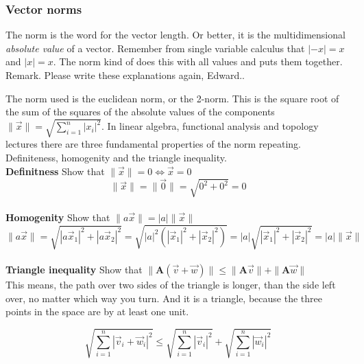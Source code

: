 \documentclass[a4paper]{article}
\begin{document}
\subsubsection{Vector norms}

The norm is the word for the vector length. Or better, it is the multidimensional \emph{absolute value} of a vector. Remember from single variable calculus that $|-x|=x$ and $|x|=x$. The norm kind of does this with all values and puts them together.\\

Remark. Please write these explanations again, Edward..

The norm used is the euclidean norm, or the 2-norm. This is the square root of the sum of the squares of the absolute values of the components $\|\vec{x}\| = \sqrt{\sum_{i=1}^{n}|x_{i}|^2}$. In linear algebra, functional analysis and topology lectures there are three fundamental properties of the norm repeating. Definiteness, homogenity and the triangle inequality.\\

\textbf{Definitness} Show that $\|\vec{x}\| = 0 \iff \vec{x} = 0$\\

\begin{displaymath}
    \|\vec{x}\| = \|\vec{0}\| = \sqrt{0^{2} + 0^{2}} = 0
\end{displaymath}\\

\textbf{Homogenity} Show that $\|a\vec{x}\| = |a|\|\vec{x}\|$\\
\begin{displaymath}
    \|a\vec{x}\| = \sqrt{|a\vec{x}_1|^{2} + |a\vec{x}_2|^{2}} = \sqrt{|a|^{2}(|\vec{x}_1|^{2} + |\vec{x}_2|^{2})} = |a|\sqrt{|\vec{x}_1|^{2} + |\vec{x}_2|^{2}} = |a|\|\vec{x}\|
\end{displaymath}\\

\textbf{Triangle inequality} Show that $ \|\boldsymbol{A}(\vec{v} + \vec{w})\| \leq \|\boldsymbol{A}\vec{v}\| + \|\boldsymbol{A}\vec{w}\|$\\

This means, the path over two sides of the triangle is longer, than the side left over, no matter which way you turn. And it is a triangle, because the three points in the space are by at least one unit.

\begin{displaymath}
    \sqrt{\sum_{i=1}^{n}|\vec{v}_{i} + \vec{w}_{i}|^{2}} \leq \sqrt{\sum_{i=1}^{n}|\vec{v}_{i}|^{2}} + \sqrt{\sum_{i=1}^{n}|\vec{w}_{i}|^{2}} 
\end{displaymath}\\
\end{document}
